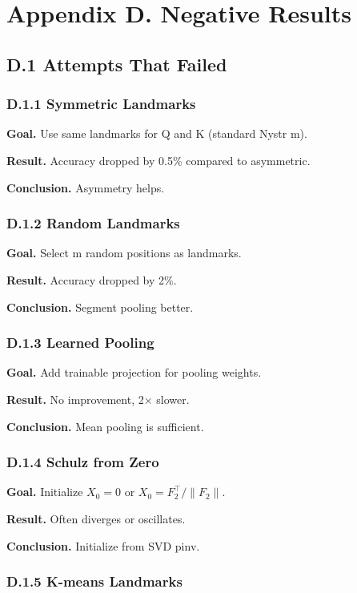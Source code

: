 
\section{Appendix D. Negative Results}

\subsection{D.1 Attempts That Failed}

\subsubsection{D.1.1 Symmetric Landmarks}

\textbf{Goal.} Use same landmarks for Q and K (standard Nystr m).

\textbf{Result.} Accuracy dropped by 0.5\% compared to asymmetric.

\textbf{Conclusion.} Asymmetry helps.

\subsubsection{D.1.2 Random Landmarks}

\textbf{Goal.} Select m random positions as landmarks.

\textbf{Result.} Accuracy dropped by 2\%.

\textbf{Conclusion.} Segment pooling better.

\subsubsection{D.1.3 Learned Pooling}

\textbf{Goal.} Add trainable projection for pooling weights.

\textbf{Result.} No improvement, 2$\times$ slower.

\textbf{Conclusion.} Mean pooling is sufficient.

\subsubsection{D.1.4 Schulz from Zero}

\textbf{Goal.} Initialize $X_0 = 0$ or $X_0 = F_2^\top / \|F_2\|$.

\textbf{Result.} Often diverges or oscillates.

\textbf{Conclusion.} Initialize from SVD pinv.

\subsubsection{D.1.5 K-means Landmarks}

